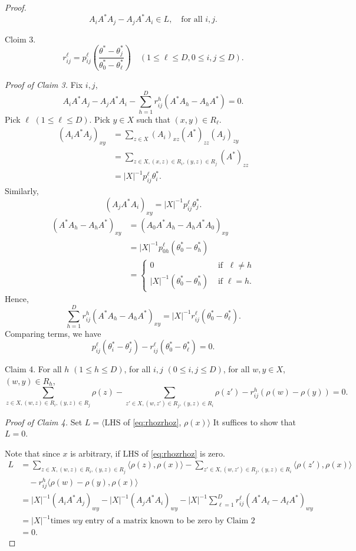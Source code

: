 \documentclass[
]{book}
\theoremstyle{definition}
\theoremstyle{definition}
\theoremstyle{definition}
\theoremstyle{definition}
\theoremstyle{remark}
\begin{document}
\begin{proof}
\[A_iA^*A_j - A_jA^*A_i\in L, \quad \text{for all $i,j$}.\]

Cloim 3.
\[r^\ell_{ij} = p^\ell_{ij}\left(\frac{\theta^*-\theta^*_j}{\theta^*_0 - \theta^*_\ell}\right)\quad (1\leq \ell\leq D, 0\leq i,j\leq D).\]

\emph{Proof of Claim 3.}
Fix \(i,j\),
\[A_iA^*A_j - A_jA^*A_i - \sum_{h=1}^D r^h_{ij}(A^*A_h - A_hA^*) = 0.\]
Pick \(\ell\) \((1\leq \ell \leq D)\). Pick \(y\in X\) such that \((x,y)\in R_\ell\).
\begin{align}
(A_iA^*A_j)_{xy} & = \sum_{z\in X}(A_i)_{xz}(A^*)_{zz}(A_j)_{zy}\\
& = \sum_{z\in X, (x,z)\in R_i, (y,z)\in R_j}(A^*)_{zz}\\
& = |X|^{-1}p^\ell_{ij}\theta^*_i.
\end{align}
Similarly,
\[(A_jA^*A_i)_{xy} = |X|^{-1}p^\ell_{ij}\theta^*_j.\]
\begin{align}
(A^*A_h-A_hA^*)_{xy} & = (A_0A^*A_h - A_hA^*A_0)_{xy}\\
& = |X|^{-1}p^\ell_{0h}(\theta^*_0 - \theta^*_h)\\
& = \begin{cases}
0 & \text{ if }\; \ell \neq h\\
|X|^{-1}(\theta^*_0-\theta^*_h) & \text{ if } \ell = h.
\end{cases}
\end{align}
Hence,
\[\sum_{h=1}^D r^h_{ij}(A^*A_h - A_hA^*)_{xy} = |X|^{-1}r^\ell_{ij}(\theta^*_0-\theta^*_\ell).\]
Comparing terms, we have
\[p^\ell_{ij}(\theta^*_i-\theta^*_j) - r^\ell_{ij}(\theta^*_0-\theta^*_\ell) = 0.\]

Claim 4. For all \(h\) \((1\leq h\leq D)\), for all \(i,j\) \((0\leq i,j\leq D)\), for all \(w,y\in X\), \((w,y)\in R_h\),
\begin{equation}
\sum_{z\in X,(w,z)\in R_i, (y,z)\in R_j}\rho(z)-\sum_{z'\in X, (w,z')\in R_j, (y,z)\in R_i}\rho(z') - r^h_{ij}(\rho(w)-\rho(y))=0. \label{eq:rhozrhoz}
\end{equation}

\emph{Proof of Claim 4.}
Set \(L = \langle \mathrm{LHS}\) of \eqref{eq:rhozrhoz}, \(\rho(x)\rangle\)
It suffices to show that \(L = 0\).

Note that since \(x\) is arbitrary, if \(\mathrm{LHS}\) of \eqref{eq:rhozrhoz} is zero.
\begin{align}
L & = \sum_{z\in X,(w,z)\in R_i, (y,z)\in R_j}\langle \rho(z), \rho(x)\rangle -\sum_{z'\in X, (w,z')\in R_j, (y,z)\in R_i}\langle\rho(z'),\rho(x)\rangle \\
& \quad - r^h_{ij}\langle \rho(w)-\rho(y), \rho(x)\rangle\\
& = |X|^{-1}(A_iA^*A_j)_{wy} - |X|^{-1}(A_jA^*A_i)_{wy}-|X|^{-1}\sum_{\ell=1}^Dr^\ell_{ij}(A^*A_\ell - A_\ell A^*)_{wy}\\
& = |X|^{-1} \text{times $wy$ entry of a matrix known to be zero by Claim 2}\\
& = 0.
\end{align}

\end{proof}
\end{document}
